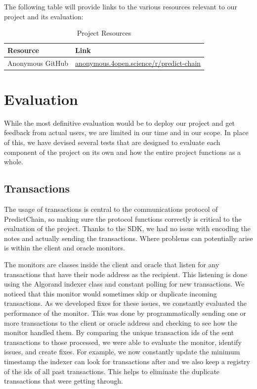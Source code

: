 \documentclass{ledger}
\begin{document}
The following table will provide links to the various resources relevant to our project and its evaluation:

\begin{table}[H]
    \caption{{Project Resources}}
    \label{tab:resources}
    \centering
    \begin{tabular}{|p{3cm}|p{11cm}|}
        \hline
        \textbf{Resource} & \textbf{Link}\\
        \hline
        Anonymous GitHub & \href{https://anonymous.4open.science/r/predict-chain}{anonymous.4open.science/r/predict-chain}\\
        \hline
    \end{tabular}
\end{table}

\section{Evaluation}

While the most definitive evaluation would be to deploy our project and get feedback from actual users, we are limited
in our time and in our scope.  In place of this, we have devised several tests that are designed to evaluate each component
of the project on its own and how the entire project functions as a whole.

\subsection{Transactions}

The usage of transactions is central to the communications protocol of PredictChain, so making sure the protocol functions
correctly is critical to the evaluation of the project.  Thanks to the SDK, we had no issue with encoding the notes and
actually sending the transactions.  Where problems can potentially arise is within the client and oracle monitors.

The monitors are classes inside the client and oracle that listen for any transactions that have their node address as
the recipient.  This listening is done using the Algorand indexer class and constant polling for new transactions. We
noticed that this monitor would sometimes skip or duplicate incoming transactions.  As we developed fixes for these
issues, we constantly evaluated the performance of the monitor.  This was done by programmatically sending one or more
transactions to the client or oracle address and checking to see how the monitor handled them.  By comparing the unique
transaction ids of the sent transactions to those processed, we were able to evaluate the monitor, identify issues, and
create fixes. For example, we now constantly update the minimum timestamp the indexer can look for transactions after and
we also keep a registry of the ids of all past transactions.  This helps to eliminate the duplicate transactions that
were getting through.
\end{document}
